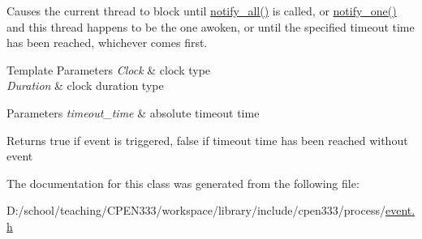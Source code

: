 Causes the current thread to block until {\ttfamily \hyperlink{classcpen333_1_1process_1_1event_a80184c9e2762fb1a0d7f3a9ff6ae27e7}{notify\+\_\+all()}} is called, or {\ttfamily \hyperlink{classcpen333_1_1process_1_1event_a47077325cc6cb29df3aba00de683ce42}{notify\+\_\+one()}} and this thread happens to be the one awoken, or until the specified timeout time has been reached, whichever comes first.


\begin{DoxyTemplParams}{Template Parameters}
{\em Clock} & clock type \\
\hline
{\em Duration} & clock duration type \\
\hline
\end{DoxyTemplParams}

\begin{DoxyParams}{Parameters}
{\em timeout\+\_\+time} & absolute timeout time \\
\hline
\end{DoxyParams}
\begin{DoxyReturn}{Returns}
{\ttfamily true} if event is triggered, {\ttfamily false} if timeout time has been reached without event 
\end{DoxyReturn}


The documentation for this class was generated from the following file\+:\begin{DoxyCompactItemize}
\item 
D\+:/school/teaching/\+C\+P\+E\+N333/workspace/library/include/cpen333/process/\hyperlink{process_2event_8h}{event.\+h}\end{DoxyCompactItemize}

